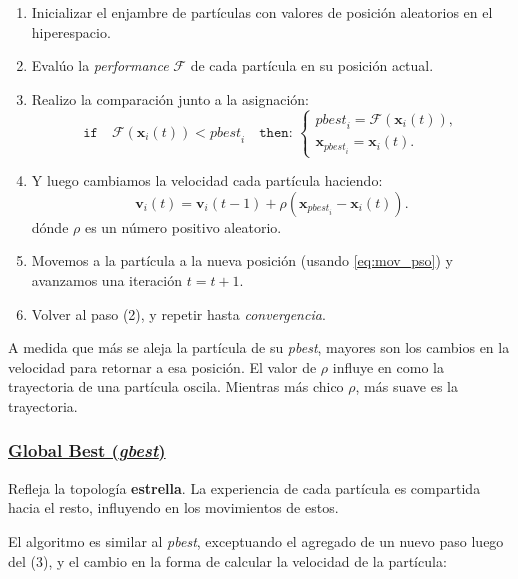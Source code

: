 \documentclass[10pt,a4paper]{article}
\begin{document}
\begin{enumerate}
\item Inicializar el enjambre de partículas con valores de posición aleatorios en el hiperespacio.
\item Evalúo la \textit{performance} $\mathcal{F}$ de cada partícula en su posición actual.
\item Realizo la comparación junto a la asignación:
\[
	\texttt{if} \quad \mathcal{F} (\mathbf{x}_i(t)) < \textit{pbest}_i \quad \texttt{then: } \left\{
	\begin{array}{l}
	\textit{pbest}_i = \mathcal{F}(\mathbf{x}_i(t)),\\
	\mathbf{x}_{\textit{pbest}_i} = \mathbf{x}_i(t).
	\end{array}
	\right.
\]
\item Y luego cambiamos la velocidad cada partícula haciendo:
\[
\mathbf{v}_{i}(t) = \mathbf{v}_{i}(t-1) + \rho(\mathbf{x}_{\textit{pbest}_i}- \mathbf{x}_i(t)).
\]
dónde $\rho$ es un número positivo aleatorio.
\item Movemos a la partícula a la nueva posición (usando \ref{eq:mov_pso}) y avanzamos una iteración $t=t+1$.
\item Volver al paso (2), y repetir hasta \textit{convergencia}.
\end{enumerate}

A medida que más se aleja la partícula de su \textit{pbest}, mayores son los cambios en la velocidad para retornar a esa posición. El valor de $\rho$ influye en como la trayectoria de una partícula oscila. Mientras más chico $\rho$, más suave es la trayectoria.

\subsubsection*{\underline{{Global Best (\textit{gbest})}}}

Refleja la topología \textbf{estrella}. La experiencia de cada partícula es compartida hacia el resto, influyendo en los movimientos de estos.

El algoritmo es similar al \textit{pbest}, exceptuando el agregado de un nuevo paso luego del (3), y el cambio en la forma de calcular la velocidad de la partícula:
\end{document}
